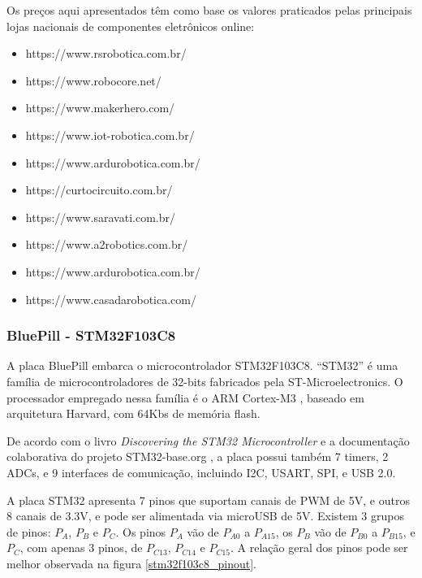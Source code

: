 Os preços aqui apresentados têm como base os valores praticados pelas principais
lojas nacionais de componentes eletrônicos online:
\begin{itemize}
	\item https://www.rsrobotica.com.br/
	\item https://www.robocore.net/
	\item https://www.makerhero.com/
	\item https://www.iot-robotica.com.br/
	\item https://www.ardurobotica.com.br/
	\item https://curtocircuito.com.br/
	\item https://www.saravati.com.br/
	\item https://www.a2robotics.com.br/
	\item https://www.ardurobotica.com.br/
	\item https://www.casadarobotica.com/
\end{itemize}



\subsubsection{BluePill - STM32F103C8} \label{STM32_referencia}

A placa BluePill embarca o microcontrolador STM32F103C8.
``STM32'' é uma família de microcontroladores de 32-bits fabricados pela
ST-Microelectronics. O processador empregado nessa família é o ARM Cortex-M3
\cite{cortex_m3}, baseado em arquitetura Harvard, com 64Kbs de memória flash.

De acordo com o livro \textit{Discovering the STM32 Microcontroller}
\cite{stm_doc} e a documentação colaborativa do projeto STM32-base.org
\cite{stm32_base_org}, a placa possui também 7 timers, 2 ADCs, e 9 interfaces de
comunicação, incluindo I2C,  USART, SPI, e USB 2.0.

A placa STM32 apresenta 7 pinos que suportam canais de PWM de 5V, e outros 8
canais de 3.3V, e pode ser alimentada via microUSB de 5V. Existem 3 grupos de
pinos: $P_{A}$, $P_{B}$ e $P_{C}$. Os pinos $P_{A}$ vão de $P_{A0}$ 
a $P_{A15}$, os $P_{B}$ vão de $P_{B0}$ a $P_{B15}$, e $P_{C}$, com apenas 3
pinos, de $P_{C13}$, $P_{C14}$ e $P_{C15}$.
A relação geral dos pinos pode ser melhor observada na figura 
\autoref{stm32f103c8_pinout}.

